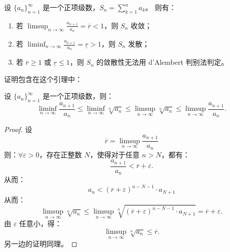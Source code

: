 \begin{theorem}\label{thm:d-alembert-comparison-test}
  设 $\{a_n\}_{n=1}^{\infty}$ 是一个正项级数，$S_n = \sum_{k=1}^{n} a_k$。
  则有：
  \begin{enumerate}
    \item 若 $\limsup_{n \to \infty} \frac{a_{n+1}}{a_n} = \overline{r} < 1$，则 $S_n$ 收敛；
    \item 若 $\liminf_{n \to \infty} \frac{a_{n+1}}{a_n} = \underline{r} > 1$，则 $S_n$ 发散；
    \item 若 $\overline{r} \geq 1$ 或 $\underline{r} \leq 1$，则 $S_n$ 的敛散性无法用 d'Alembert 判别法判定。
  \end{enumerate}
\end{theorem}

证明包含在这个引理中：

\begin{lemma}
  设 $\{a_n\}_{n=1}^{\infty}$ 是一个正项级数，则：
  \begin{equation*}
    \liminf_{n \to \infty} \frac{a_{n+1}}{a_n}
    \leq \liminf_{n \to \infty} \sqrt[n]{a_n}
    \leq \limsup_{n \to \infty} \sqrt[n]{a_n}
    \leq \limsup_{n \to \infty} \frac{a_{n+1}}{a_n} .
  \end{equation*}
\end{lemma}

\begin{proof}
  设
  \begin{equation*}
    \overline{r} = \limsup_{n \to \infty} \frac{a_{n+1}}{a_n}
  \end{equation*}
  则：$\forall \varepsilon > 0$，存在正整数 $N$，使得对于任意 $n > N$，都有：
  \begin{equation*}
    \frac{a_{n+1}}{a_n} < \overline{r} + \varepsilon.
  \end{equation*}
  从而：
  \begin{equation*}
    a_n < (\overline{r} + \varepsilon)^{n-N-1} \cdot a_{N+1}
  \end{equation*}
  从而：
  \begin{equation*}
    \limsup_{n \to \infty} \sqrt[n]{a_n}
    \leq \limsup_{n \to \infty} \sqrt[n]{(\overline{r} + \varepsilon)^{n-N-1} \cdot a_{N+1}}
    = \overline{r} + \varepsilon.
  \end{equation*}
  由 $\varepsilon$ 任意小，得：
  \begin{equation*}
    \limsup_{n \to \infty} \sqrt[n]{a_n} \leq \overline{r}.
  \end{equation*}
  另一边的证明同理。
\end{proof}

